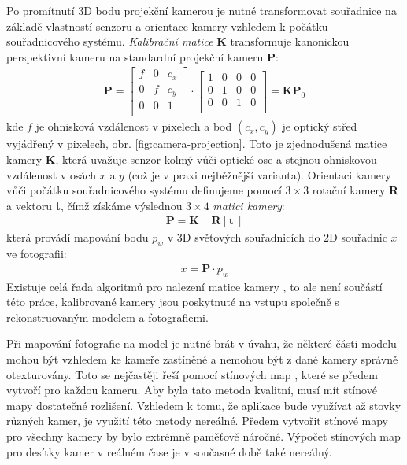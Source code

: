 \documentclass[11pt,twoside,a4paper]{book}
\begin{document}
Po promítnutí 3D bodu projekční kamerou je nutné transformovat souřadnice na základě vlastností senzoru a orientace kamery vzhledem k počátku souřadnicového systému.  \emph{Kalibrační matice} \textbf{K} transformuje kanonickou perspektivní kameru na standardní projekční kameru \textbf{P}: 
\begin{align}
\label{eq:calibration-matrix}
\textbf{P} = 
\begin{bmatrix}
f & 0 & c_x  \\
0 & f & c_y  \\
0 & 0 & 1  \\
\end{bmatrix}
\cdot
\begin{bmatrix}
1 & 0 & 0 & 0 \\
0 & 1 & 0 & 0 \\
0 & 0 & 1 & 0 \\
\end{bmatrix}
 =\textbf{K}\textbf{P}_0
\end{align}
\noindent
kde $f$ je ohnisková vzdálenost v pixelech a bod $(c_x, c_y)$ je optický střed vyjádřený v pixelech, obr. \ref{fig:camera-projection}. Toto je zjednodušená matice kamery \textbf{K}, která uvažuje senzor kolmý vůči optické ose a stejnou ohniskovou vzdálenost v osách $x$ a $y$ (což je v praxi nejběžnější varianta). Orientaci kamery vůči počátku souřadnicového systému definujeme pomocí $3\times3$ rotační kamery \textbf{R} a vektoru \textbf{t}, čímž získáme výslednou $3\times4$ \emph{matici kamery}:
\begin{align} 
\textbf{P} = \textbf{K}~[~\textbf{R}~|~\textbf{t}~]
\end{align}
\noindent
která provádí mapování bodu $p_w$ v 3D světových souřadnicích do 2D souřadnic $x$ ve fotografii:
\begin{align}
x = \textbf{P}\cdotp p_w
\end{align}
Existuje celá řada algoritmů pro nalezení matice kamery \cite{Hartley2004}, to ale není součástí této práce, kalibrované kamery jsou poskytnuté na vstupu společně s rekonstruovaným modelem a fotografiemi.

Při mapování fotografie na model je nutné brát v úvahu, že některé části modelu mohou být vzhledem ke kameře zastíněné a nemohou být z dané kamery správně otexturovány. Toto se nejčastěji řeší pomocí stínových map \cite{Stamminger2002}, které se předem vytvoří pro každou kameru. Aby byla tato metoda kvalitní, musí mít stínové mapy dostatečné rozlišení.  Vzhledem k tomu, že aplikace bude využívat až stovky různých kamer, je využití této metody nereálné. Předem vytvořit stínové mapy pro všechny kamery by bylo extrémně paměťově náročné. Výpočet stínových map pro desítky kamer v reálném čase je v současné době také nereálný.
\end{document}

